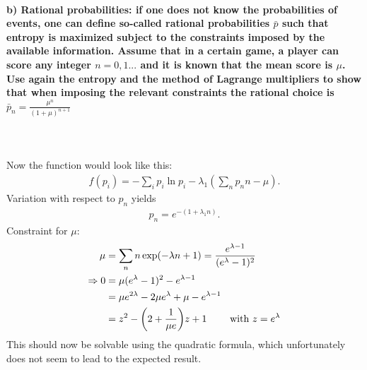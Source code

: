 \paragraph{b) Rational probabilities: if one does not know the 
    probabilities of events, one can define so-called 
    rational probabilities $\bar{p}$ such that entropy is maximized 
    subject to the constraints imposed by the available information.
    Assume that in a certain game, a player can score any integer 
    $n=0,1...$ and it is known that the mean score is $\mu$. Use again
    the entropy and the method of Lagrange multipliers to show that 
    when imposing the relevant constraints the rational choice is 
    $\bar{p}_n=\frac{\mu^n}{(1+\mu)^{n+1}}$
} \ \\
\\
    Now the function would look like this:
    \begin{align}
    f(p_i)=-\sum_i p_i\ln p_i-\lambda_1\left(\sum_n p_nn-\mu\right).
    \end{align}
    Variation with respect to $p_n$ yields
    \begin{align}
    p_n = e^{- (1 + \lambda_1 n)}.
    \end{align}
    Constraint for $\mu$:
    \begin{align}
        \mu
        &=\sum_n n\exp(-\lambda n+1)
        =\frac{e^{\lambda-1}}{(e^{\lambda}-1)^2} \\
        \Rightarrow 0
        &=\mu(e^\lambda-1)^2-e^{\lambda-1} \\
        &=\mu e^{2\lambda}-2\mu e^\lambda+\mu-e^{\lambda-1} \\
        &=z^2-\bigg(2+\frac{1}{\mu e}\bigg)z+1\ \ \ \ \ \ \ 
        \textnormal{with } z=e^\lambda
    \end{align}
    This should now be solvable using the quadratic formula, which unfortunately
    does not seem to lead to the expected result.
